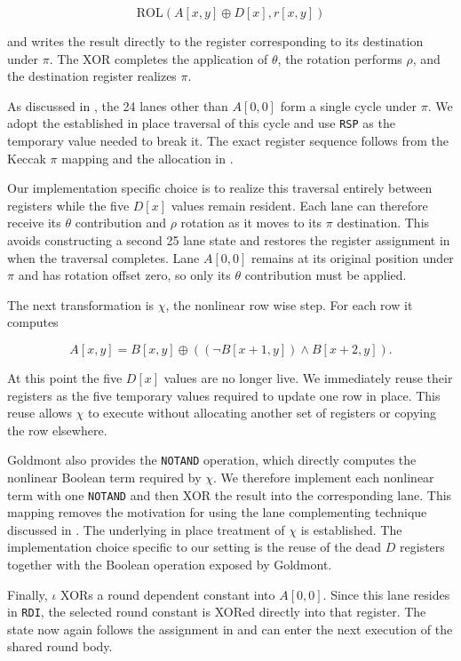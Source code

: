 \documentclass[journal=tches,submission]{iacrtrans}
\newcommand{\code}[1]{\texttt{#1}}
\newcommand{\uop}[1]{\code{\textmu#1}}%
\begin{document}
$$
\mathrm{ROL}\left(A[x,y]\oplus D[x],r[x,y]\right)
$$

and writes the result directly to the register corresponding to its destination under \(\pi\). 
The XOR completes the application of \(\theta\), the rotation performs \(\rho\), and the destination register realizes \(\pi\).

As discussed in , the 24 lanes other than \(A[0,0]\) form a single cycle under \(\pi\). 
We adopt the established in place traversal of this cycle and use \code{RSP} as the temporary value needed to break it. 
The exact register sequence follows from the Keccak \(\pi\) mapping and the allocation in .

Our implementation specific choice is to realize this traversal entirely between registers while the five \(D[x]\) values remain resident. 
Each lane can therefore receive its \(\theta\) contribution and \(\rho\) rotation as it moves to its \(\pi\) destination. 
This avoids constructing a second 25 lane state and restores the register assignment in  when the traversal completes. 
Lane \(A[0,0]\) remains at its original position under \(\pi\) and has rotation offset zero, so only its \(\theta\) contribution must be applied.

The next transformation is \(\chi\), the nonlinear row wise step. For each row it computes

$$
A[x,y]
=
B[x,y]
\oplus
\left(
(\lnot B[x+1,y]) \wedge B[x+2,y]
\right).
$$

At this point the five \(D[x]\) values are no longer live. 
We immediately reuse their registers as the five temporary values required to update one row in place. 
This reuse allows \(\chi\) to execute without allocating another set of registers or copying the row elsewhere.

Goldmont also provides the \uop{NOTAND} operation, which directly computes the nonlinear Boolean term required by \(\chi\). 
We therefore implement each nonlinear term with one \uop{NOTAND} and then XOR the result into the corresponding lane. 
This mapping removes the motivation for using the lane complementing technique discussed in . 
The underlying in place treatment of \(\chi\) is established. 
The implementation choice specific to our setting is the reuse of the dead \(D\) registers together with the Boolean operation exposed by Goldmont.

Finally, \(\iota\) XORs a round dependent constant into \(A[0,0]\). 
Since this lane resides in \code{RDI}, the selected round constant is XORed directly into that register. 
The state now again follows the assignment in  and can enter the next execution of the shared round body.
\end{document}

